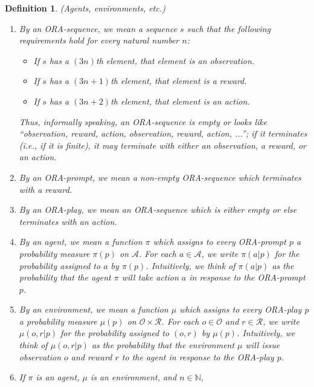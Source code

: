 \documentclass{article}
\newtheorem{definition}[theorem]{Definition}
\begin{document}
\begin{definition}
\label{omnibusdefn}
    (Agents, environments, etc.)
    \begin{enumerate}
        \item
        By an \emph{ORA-sequence}, we mean a sequence $s$ such that the following requirements
        hold for every natural number $n$:
        \begin{itemize}
            \item If $s$ has a $(3n)$th element, that element is an observation.
            \item If $s$ has a $(3n+1)$th element, that element is a reward.
            \item If $s$ has a $(3n+2)$th element, that element is an action.
        \end{itemize}
        Thus, informally speaking, an ORA-sequence is empty or
        looks like ``observation, reward, action, observation, reward, action, ...'';
        if it terminates (i.e., if it is finite), it may terminate with
        either an observation, a reward, or an action.
        \item
        By an \emph{ORA-prompt}, we mean a non-empty ORA-sequence which
        terminates with a reward.
        \item
        By an \emph{ORA-play}, we mean an ORA-sequence which is either empty or else
        terminates with an action.
        \item
        By an \emph{agent}, we mean a function $\pi$ which assigns to every
        ORA-prompt $p$ a probability measure $\pi(p)$ on $\mathcal A$.
        For each $a\in\mathcal A$,
        we write $\pi(a|p)$ for the probability assigned to $a$ by $\pi(p)$.
        Intuitively, we think of $\pi(a|p)$ as the probability that the agent $\pi$
        will take action $a$ in response to the ORA-prompt $p$.
        \item
        By an \emph{environment}, we mean a function $\mu$
        which assigns to every ORA-play $p$ a probability measure $\mu(p)$
        on $\mathcal O\times\mathcal R$.
        For each $o\in\mathcal O$ and $r\in\mathcal R$, we write $\mu(o,r|p)$
        for the probability assigned to $(o,r)$ by $\mu(p)$.
        Intuitively, we think of $\mu(o,r|p)$ as the
        probability that the environment
        $\mu$ will issue observation $o$ and reward $r$ to the agent in response
        to the ORA-play $p$.
        \item
        If $\pi$ is an agent, $\mu$ is an environment, and $n\in\mathbb N$,

\end{enumerate}
\end{definition}
\end{document}
